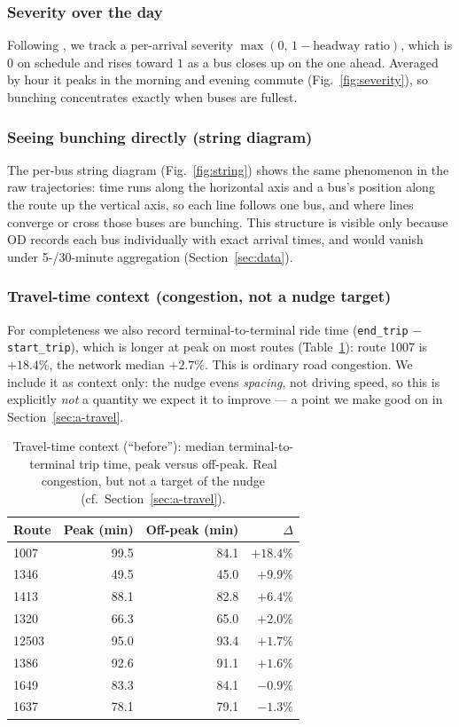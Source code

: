 \documentclass[11pt,a4paper]{article}
\begin{document}
\subsubsection{Severity over the day}
\label{sec:b-sev}
Following \citet{Enayatollahi2019}, we track a per-arrival severity $\max(0,\,1-\text{headway ratio})$,
which is $0$ on schedule and rises toward $1$ as a bus closes up on the one ahead. Averaged by hour it
peaks in the morning and evening commute (Fig.~\ref{fig:severity}), so bunching concentrates exactly
when buses are fullest.

\subsubsection{Seeing bunching directly (string diagram)}
\label{sec:b-string}
The per-bus string diagram (Fig.~\ref{fig:string}) shows the same phenomenon in the raw trajectories:
time runs along the horizontal axis and a bus's position along the route up the vertical axis, so each
line follows one bus, and where lines converge or cross those buses are bunching. This structure is
visible only because OD records each bus individually with exact arrival times, and would vanish under
5-/30-minute aggregation (Section~\ref{sec:data}).

\subsubsection{Travel-time context (congestion, not a nudge target)}
\label{sec:b-travel}
For completeness we also record terminal-to-terminal ride time
(\texttt{end\_trip} $-$ \texttt{start\_trip}), which is longer at peak on most routes
(Table~\ref{tab:travel}): route 1007 is $+18.4\%$, the network median $+2.7\%$. This is ordinary road
congestion. We include it as context only: the nudge evens \emph{spacing}, not driving speed, so this
is explicitly \emph{not} a quantity we expect it to improve --- a point we make good on in
Section~\ref{sec:a-travel}.

\begin{table}[htbp]
\centering
\small
\caption{Travel-time context (``before''): median terminal-to-terminal trip time, peak versus
off-peak. Real congestion, but not a target of the nudge (cf.\ Section~\ref{sec:a-travel}).}
\label{tab:travel}
\begin{tabular}{lrrr}
\toprule
Route & Peak (min) & Off-peak (min) & $\Delta$ \\
\midrule
1007  & 99.5 & 84.1 & $+18.4\%$ \\
1346  & 49.5 & 45.0 & $+9.9\%$  \\
1413  & 88.1 & 82.8 & $+6.4\%$  \\
1320  & 66.3 & 65.0 & $+2.0\%$  \\
12503 & 95.0 & 93.4 & $+1.7\%$  \\
1386  & 92.6 & 91.1 & $+1.6\%$  \\
1649  & 83.3 & 84.1 & $-0.9\%$  \\
1637  & 78.1 & 79.1 & $-1.3\%$  \\
\bottomrule
\end{tabular}
\end{table}
\end{document}
